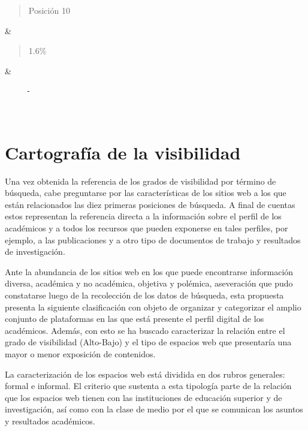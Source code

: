 \documentclass[
]{interact}
\begin{document}
\begin{longtable}[]
\begin{minipage}[t]{\linewidth}\raggedright
\begin{quote}
Posición 10
\end{quote}
\end{minipage} & \begin{minipage}[t]{\linewidth}\raggedright
\begin{quote}
1.6\%
\end{quote}
\end{minipage} & \begin{minipage}[t]{\linewidth}\raggedright
\begin{verbatim}
     -
\end{verbatim}
\end{minipage} \\
\end{longtable}

\section{Cartografía de la
visibilidad}\label{cartografuxeda-de-la-visibilidad}

Una vez obtenida la referencia de los grados de visibilidad por término
de búsqueda, cabe preguntarse por las características de los sitios web
a los que están relacionados las diez primeras posiciones de búsqueda. A
final de cuentas estos representan la referencia directa a la
información sobre el perfil de los académicos y a todos los recursos que
pueden exponerse en tales perfiles, por ejemplo, a las publicaciones y a
otro tipo de documentos de trabajo y resultados de investigación.

Ante la abundancia de los sitios web en los que puede encontrarse
información diversa, académica y no académica, objetiva y polémica,
aseveración que pudo constatarse luego de la recolección de los datos de
búsqueda, esta propuesta presenta la siguiente clasificación con objeto
de organizar y categorizar el amplio conjunto de plataformas en las que
está presente el perfil digital de los académicos. Además, con esto se
ha buscado caracterizar la relación entre el grado de visibilidad
(Alto-Bajo) y el tipo de espacios web que presentaría una mayor o menor
exposición de contenidos.

La caracterización de los espacios web está dividida en dos rubros
generales: formal e informal. El criterio que sustenta a esta tipología
parte de la relación que los espacios web tienen con las instituciones
de educación superior y de investigación, así como con la clase de medio
por el que se comunican los asuntos y resultados académicos.
\end{document}
